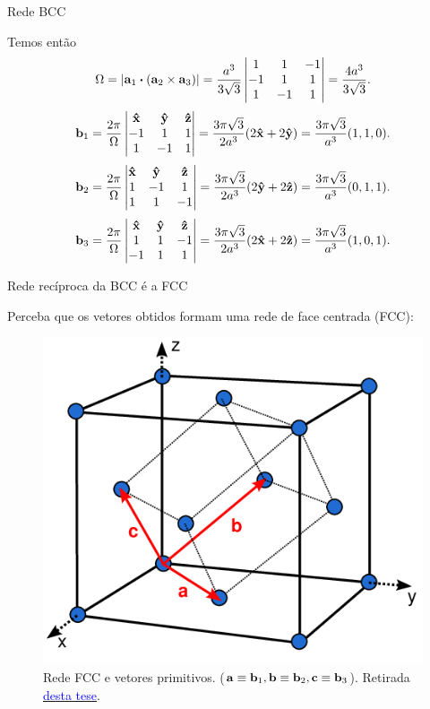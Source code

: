 \documentclass[aspectratio=169]{beamer}
\begin{document}


\begin{frame}{Rede BCC}

Temos então
$$
\Omega = \abs{\a_1 \vdot (\a_2 \times \a_3)} =
\frac{a^3}{3\sqrt{3}}
\begin{vmatrix}
1 & 1 & -1 \\
-1 & 1 & 1 \\
1 & -1 & 1 \\
\end{vmatrix}
=
\frac{4a^3}{3\sqrt{3}}.
$$
$$
\vb{b}_1 = \frac{2\pi}{\Omega}
\begin{vmatrix}
\vu{x} & \vu{y} & \vu{z} \\
-1 & 1 & 1 \\
1 & -1 & 1 \\
\end{vmatrix}
=
\frac{3\pi\sqrt{3}}{2a^3} (2\vu{x} + 2\vu{y}) = \frac{3\pi\sqrt{3}}{a^3} (1, 1, 0).
$$
$$
\vb{b}_2 = \frac{2\pi}{\Omega}
\begin{vmatrix}
\vu{x} & \vu{y} & \vu{z} \\
1 & -1 & 1 \\
1 & 1 & -1 \\
\end{vmatrix}
=
\frac{3\pi\sqrt{3}}{2a^3} (2\vu{y} + 2\vu{z}) = \frac{3\pi\sqrt{3}}{a^3} (0, 1, 1).
$$
$$
\vb{b}_3 = \frac{2\pi}{\Omega}
\begin{vmatrix}
\vu{x} & \vu{y} & \vu{z} \\
1 & 1 & -1 \\
-1 & 1 & 1 \\
\end{vmatrix}
=
\frac{3\pi\sqrt{3}}{2a^3} (2\vu{x} + 2\vu{z}) = \frac{3\pi\sqrt{3}}{a^3} (1, 0, 1).
$$

\end{frame}




\begin{frame}{Rede recíproca da BCC é a FCC}

Perceba que os vetores obtidos formam uma rede de face centrada (FCC):
\begin{figure}[H]
\centering
\includegraphics[width=0.4\linewidth]{fig/fcc.png}
\caption{Rede FCC e vetores primitivos. ($\vb{a} \equiv \vb{b}_1, \vb{b} \equiv \vb{b}_2, \vb{c} \equiv \vb{b}_3$). Retirada \href{https://www.researchgate.net/publication/264872465_Fabrication_and_characterisation_of_three-dimensional_passive_and_active_photonic_crystals}{\textcolor{blue}{desta tese}}.}
\label{fig:fcc}
\end{figure}

\end{frame}
\end{document}
